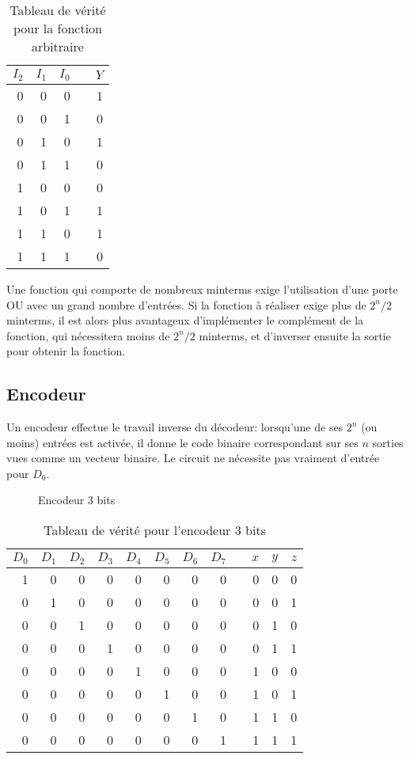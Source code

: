 \documentclass[11pt]{article}
\begin{document}
\begin{table}[htbp]
\caption{\label{tab:org99ccb56}Tableau de vérité pour la fonction arbitraire}
\centering
\begin{tabular}{rrrlr}
\(I_2\) & \(I_1\) & \(I_0\) &  & \(Y\)\\
\hline
0 & 0 & 0 &  & 1\\
0 & 0 & 1 &  & 0\\
0 & 1 & 0 &  & 1\\
0 & 1 & 1 &  & 0\\
1 & 0 & 0 &  & 0\\
1 & 0 & 1 &  & 1\\
1 & 1 & 0 &  & 1\\
1 & 1 & 1 &  & 0\\
\end{tabular}
\end{table}

Une fonction qui comporte de nombreux minterms exige l'utilisation
d'une porte OU avec un grand nombre d'entrées. Si la fonction à
réaliser exige plus de \(2^n/2\) minterms, il est alors plus
avantageux d'implémenter le complément de la fonction, qui nécessitera
moins de \(2^n/2\) minterms, et d'inverser ensuite la sortie pour
obtenir la fonction.

\subsection{Encodeur}
\label{sec:org114dc34}

Un encodeur effectue le travail inverse du décodeur: lorsqu'une de ses
\(2^n\) (ou moins) entrées est activée, il donne le code binaire
correspondant sur ses \(n\) sorties vues comme un vecteur binaire. Le
circuit ne nécessite pas vraiment d'entrée pour \(D_0\).


\begin{figure}[htbp]
\centering

\caption{\label{fig:org253e1be}Encodeur 3 bits}
\end{figure}


\begin{table}[htbp]
\caption{\label{tab:orgce20daf}Tableau de vérité pour l'encodeur 3 bits}
\centering
\begin{tabular}{rrrrrrrrlrrr}
\(D_0\) & \(D_1\) & \(D_2\) & \(D_3\) & \(D_4\) & \(D_5\) & \(D_6\) & \(D_7\) &  & \(x\) & \(y\) & \(z\)\\
\hline
1 & 0 & 0 & 0 & 0 & 0 & 0 & 0 &  & 0 & 0 & 0\\
0 & 1 & 0 & 0 & 0 & 0 & 0 & 0 &  & 0 & 0 & 1\\
0 & 0 & 1 & 0 & 0 & 0 & 0 & 0 &  & 0 & 1 & 0\\
0 & 0 & 0 & 1 & 0 & 0 & 0 & 0 &  & 0 & 1 & 1\\
0 & 0 & 0 & 0 & 1 & 0 & 0 & 0 &  & 1 & 0 & 0\\
0 & 0 & 0 & 0 & 0 & 1 & 0 & 0 &  & 1 & 0 & 1\\
0 & 0 & 0 & 0 & 0 & 0 & 1 & 0 &  & 1 & 1 & 0\\
0 & 0 & 0 & 0 & 0 & 0 & 0 & 1 &  & 1 & 1 & 1\\
\end{tabular}
\end{table}
\end{document}
